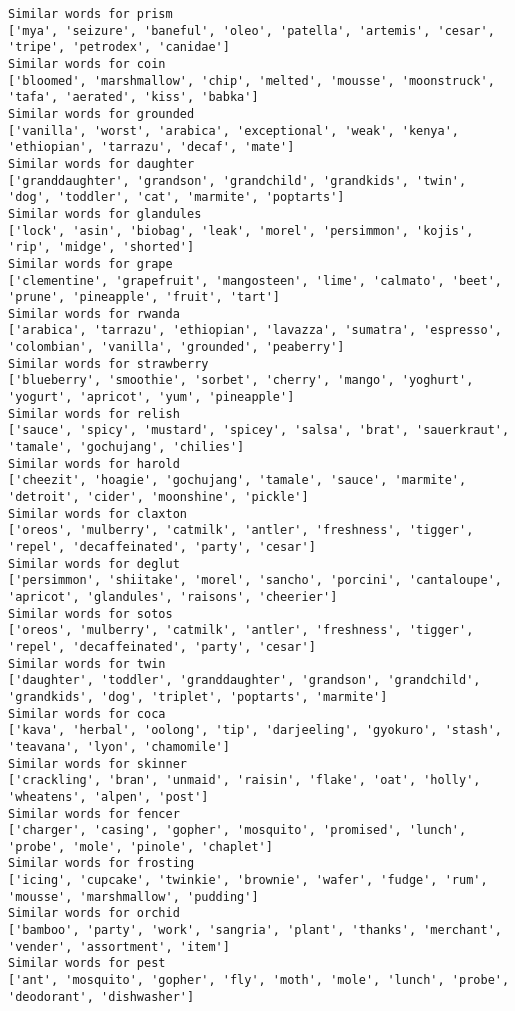 \documentclass[11pt]{article}
\begin{document}
\begin{Verbatim}[commandchars=\\\{\}]
Similar words for prism
['mya', 'seizure', 'baneful', 'oleo', 'patella', 'artemis', 'cesar', 'tripe', 'petrodex', 'canidae']
Similar words for coin
['bloomed', 'marshmallow', 'chip', 'melted', 'mousse', 'moonstruck', 'tafa', 'aerated', 'kiss', 'babka']
Similar words for grounded
['vanilla', 'worst', 'arabica', 'exceptional', 'weak', 'kenya', 'ethiopian', 'tarrazu', 'decaf', 'mate']
Similar words for daughter
['granddaughter', 'grandson', 'grandchild', 'grandkids', 'twin', 'dog', 'toddler', 'cat', 'marmite', 'poptarts']
Similar words for glandules
['lock', 'asin', 'biobag', 'leak', 'morel', 'persimmon', 'kojis', 'rip', 'midge', 'shorted']
Similar words for grape
['clementine', 'grapefruit', 'mangosteen', 'lime', 'calmato', 'beet', 'prune', 'pineapple', 'fruit', 'tart']
Similar words for rwanda
['arabica', 'tarrazu', 'ethiopian', 'lavazza', 'sumatra', 'espresso', 'colombian', 'vanilla', 'grounded', 'peaberry']
Similar words for strawberry
['blueberry', 'smoothie', 'sorbet', 'cherry', 'mango', 'yoghurt', 'yogurt', 'apricot', 'yum', 'pineapple']
Similar words for relish
['sauce', 'spicy', 'mustard', 'spicey', 'salsa', 'brat', 'sauerkraut', 'tamale', 'gochujang', 'chilies']
Similar words for harold
['cheezit', 'hoagie', 'gochujang', 'tamale', 'sauce', 'marmite', 'detroit', 'cider', 'moonshine', 'pickle']
Similar words for claxton
['oreos', 'mulberry', 'catmilk', 'antler', 'freshness', 'tigger', 'repel', 'decaffeinated', 'party', 'cesar']
Similar words for deglut
['persimmon', 'shiitake', 'morel', 'sancho', 'porcini', 'cantaloupe', 'apricot', 'glandules', 'raisons', 'cheerier']
Similar words for sotos
['oreos', 'mulberry', 'catmilk', 'antler', 'freshness', 'tigger', 'repel', 'decaffeinated', 'party', 'cesar']
Similar words for twin
['daughter', 'toddler', 'granddaughter', 'grandson', 'grandchild', 'grandkids', 'dog', 'triplet', 'poptarts', 'marmite']
Similar words for coca
['kava', 'herbal', 'oolong', 'tip', 'darjeeling', 'gyokuro', 'stash', 'teavana', 'lyon', 'chamomile']
Similar words for skinner
['crackling', 'bran', 'unmaid', 'raisin', 'flake', 'oat', 'holly', 'wheatens', 'alpen', 'post']
Similar words for fencer
['charger', 'casing', 'gopher', 'mosquito', 'promised', 'lunch', 'probe', 'mole', 'pinole', 'chaplet']
Similar words for frosting
['icing', 'cupcake', 'twinkie', 'brownie', 'wafer', 'fudge', 'rum', 'mousse', 'marshmallow', 'pudding']
Similar words for orchid
['bamboo', 'party', 'work', 'sangria', 'plant', 'thanks', 'merchant', 'vender', 'assortment', 'item']
Similar words for pest
['ant', 'mosquito', 'gopher', 'fly', 'moth', 'mole', 'lunch', 'probe', 'deodorant', 'dishwasher']

\end{Verbatim}
\end{document}
